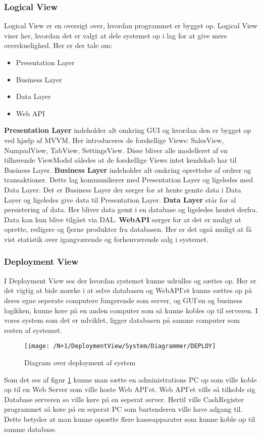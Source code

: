 \subsubsection{Logical View}
Logical View er en oversigt over, hvordan programmet er bygget op. Logical View viser her, hvordan det er valgt at dele systemet op i lag for at give mere overskuelighed. Her er der tale om:
\begin{itemize}
	\item Presentation Layer
	\item Business Layer
	\item Data Layer
	\item Web API
\end{itemize}
 
\textbf{Presentation Layer} indeholder alt omkring \gls{GUI} og hvordan den er bygget op ved hjælp af \gls{MVVM}. Her introduceres de forskellige \gls{Views}: SalesView, NumpadView, TabView, SettingsView. Disse bliver alle modelleret af en tilhørende \gls{ViewModel} således at de forskellige \gls{Views} intet kendskab har til Business Layer. \textbf{Business Layer} indeholder alt omkring oprettelse af ordrer og transaktioner. Dette lag kommunikerer med Presentation Layer og ligeledes med Data Layer. Det er Business Layer der sørger for at hente gemte data i Data Layer og ligeledes give data til Presentation Layer.\newline
\textbf{Data Layer} står for al persistering af data. Her bliver data gemt i en database og ligeledes hentet derfra. Data kan kun blive tilgået via \gls{DAL}.\newline
\textbf{WebAPI} sørger for at det er muligt at oprette, redigere og fjerne produkter fra databasen. Her er det også muligt at få vist statistik over igangværende og forhenværende salg i systemet. 

\subsubsection{Deployment View}
I Deployment View ses der hvordan systemet kunne udrulles og sættes op. Her er det vigtig at bide mærke i at selve databasen og \gls{WebAPI}'et kunne sættes op på deres egne seperate computere fungerende som server, og GUI'en og business logikken, kunne køre på en anden computer som så kunne kobles op til serveren. I vores system som det er udviklet, ligger databasen på samme computer som resten af systemet. \newline\newline
\begin{figure}[H]
	\centering
	\texttt{[image: /N+1/DeploymentView/System/Diagrammer/DEPLOY]}
	\caption{Diagram over deployment af system}
	\label{fig:DeplayDia}
\end{figure}
Som det ses af figur \ref{fig:DeplayDia} kunne man sætte en administrations PC op som ville koble op til en Web Server som ville hoste Web API'et. Web API'et ville så tilkoble sig Database serveren so  ville køre på en seperat server. Hertil ville CashRegister programmet så køre på en seperat PC som bartenderen ville have adgang til. Dette betyder at man kunne opsætte flere kasseapparater som kunne koble op til samme database.  

